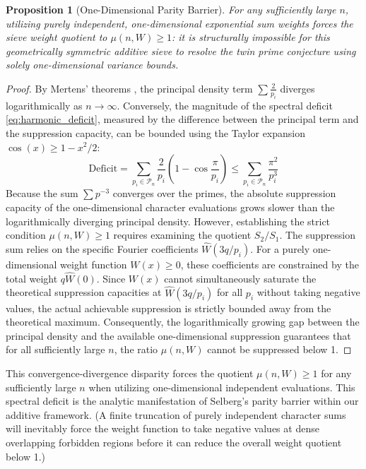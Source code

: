 \documentclass[reqno,notitlepage]{amsart}
\newtheorem{proposition}[theorem]{Proposition}
\theoremstyle{remark}
\begin{document}
\begin{proposition}[One-Dimensional Parity Barrier] \label{prop:parity_collision}
For any sufficiently large $n$, utilizing purely independent, one-dimensional exponential sum weights
forces the sieve weight quotient to $\mu(n, W) \ge 1$: it is structurally impossible for this
geometrically symmetric additive sieve to resolve the twin prime conjecture using solely
one-dimensional variance bounds.
\end{proposition}
\begin{proof}
By Mertens' theorems \cite{MontgomeryVaughan2006}, the principal density term $\sum \frac{2}{p_i}$
diverges logarithmically as $n \to \infty$. Conversely, the magnitude of the spectral deficit
\eqref{eq:harmonic_deficit}, measured by the difference between the principal term and the suppression
capacity, can be bounded using the Taylor expansion $\cos(x) \ge 1 - x^2/2$:
\[ \text{Deficit} = \sum_{p_i \in \mathcal{P}_n} \frac{2}{p_i}\left(1 - \cos\frac{\pi}{p_i}\right) \le \sum_{p_i \in \mathcal{P}_n} \frac{\pi^2}{p_i^3} \]
Because the sum $\sum p^{-3}$ converges over the primes, the absolute suppression capacity
of the one-dimensional character evaluations grows slower than the logarithmically diverging
principal density. However, establishing the strict condition $\mu(n, W) \ge 1$ requires examining
the quotient $S_2/S_1$. The suppression sum relies on the specific Fourier coefficients
$\hat{W}(3q/p_i)$. For a purely one-dimensional weight function $W(x) \ge 0$, these coefficients are
constrained by the total weight $q\hat{W}(0)$. Since $W(x)$ cannot simultaneously saturate the
theoretical suppression capacities at $\hat{W}(3q/p_i)$ for all $p_i$ without taking negative
values, the actual achievable suppression is strictly bounded away from the theoretical maximum.
Consequently, the logarithmically growing gap between the principal density and the available
one-dimensional suppression guarantees that for all sufficiently large $n$, the ratio $\mu(n, W)$
cannot be suppressed below 1.
\end{proof}

This convergence-divergence disparity forces the quotient $\mu(n, W) \ge 1$ for any sufficiently
large $n$ when utilizing one-dimensional independent evaluations. This spectral deficit is 
the analytic manifestation of Selberg's parity barrier within our additive framework.
(A finite truncation of purely independent character sums will inevitably force the weight function
to take negative values at dense overlapping forbidden regions before it can reduce the overall
weight quotient below 1.) 
\end{document}
